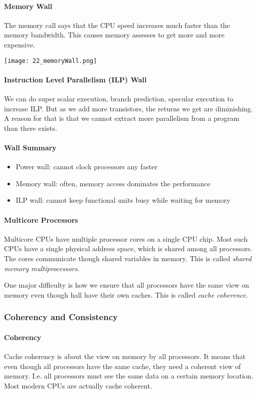 \paragraph{Memory Wall}
The memory call says that the CPU speed increases much faster than the memory bandwidth. This causes memory assesses to get more and more expensive.

\texttt{[image: 22\_memoryWall.png]}

\paragraph{Instruction Level Parallelism (ILP) Wall}
We can do super scalar execution, branch prediction, specular execution to increase ILP. But as we add more transistors, the returns we get are diminishing. A reason for that is that we cannot extract more parallelism from a program than there exists.

\paragraph{Wall Summary}
\begin{itemize}
    \item Power wall: cannot clock processors any faster
    \item Memory wall: often, memory access dominates the performance
    \item ILP wall: cannot keep functional units busy while waiting for memory
\end{itemize}

\paragraph{Multicore Processors}
Multicore CPUs have multiple processor cores on a single CPU chip. Most such CPUs have a single physical address space, which is shared among all processors. The cores communicate though shared variables in memory. This is called \textit{shared memory multiprocessors}.

One major difficulty is how we ensure that all processors have the same view on memory even though hall have their own caches. This is called \textit{cache coherence}.

\subsubsection{Coherency and Consistency}

\paragraph{Coherency}
Cache coherency is about the view on memory by all processors. It means that even though all processors have the same cache, they need a coherent view of memory. I.e. all processors must see the same data on a certain memory location. Most modern CPUs are actually cache coherent. 

